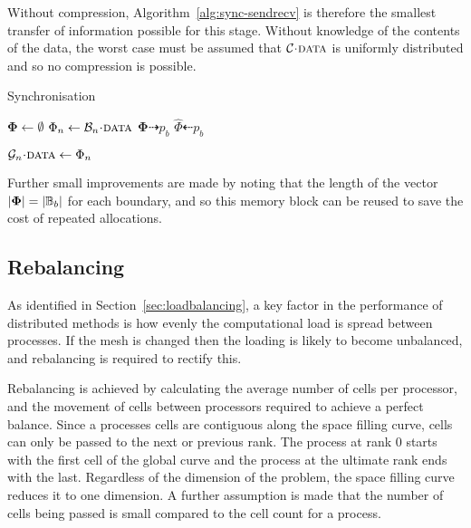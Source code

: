 \documentclass[twoside]{IIBproject}
\newcommand{\vect} [1] {\bm{#1}}
\newcommand{\dra}{\dashrightarrow}
\newcommand{\dla}{\dashleftarrow}
\newcommand{\acc}{{\mkern 0.5mu\cdot\mkern 0.5mu}}
\numberwithin{figure}{section}
\begin{document}
        Without compression, Algorithm~\ref{alg:sync-sendrecv} is therefore the smallest transfer of information possible for this stage. Without knowledge of the contents of the data, the worst case must be assumed that $\mathcal{C}\acc\textproc{data}$ is uniformly distributed and so no compression is possible. 

        \begin{algorithm}[H]
            \caption{Synchronisation}
            \label{alg:sync-sendrecv}

            \begin{algorithmic}
                    \State $\vect{\Phi} \gets \emptyset$
                        \State $\Phi_n \gets \mathcal{B}_n\acc\textproc{data}$
                    \EndFor
                    \Send $\vect{\Phi} \dra p_b$
                \EndFor
                \Statex
                    \Recv $\hat \Phi \dla p_b$

                        \State $\mathcal{G}_n\acc\textproc{data} \gets \Phi_n$
                    \EndFor
                \EndFor
            \end{algorithmic}
        \end{algorithm}

        Further small improvements are made by noting that the length of the vector $\abs{\vect{\Phi}} = \abs{\mathbb{B}_b}$ for each boundary, and so this memory block can be reused to save the cost of repeated allocations.



    \subsection{Rebalancing} %
        \label{sec:rebalancing}

        As identified in Section~\ref{sec:loadbalancing}, a key factor in the performance of distributed methods is how evenly the computational load is spread between processes. If the mesh is changed then the loading is likely to become unbalanced, and rebalancing is required to rectify this. 

        Rebalancing is achieved by calculating the average number of cells per processor, and the movement of cells between processors required to achieve a perfect balance. Since a processes cells are contiguous along the space filling curve, cells can only be passed to the next or previous rank. The process at rank 0 starts with the first cell of the global curve and the process at the ultimate rank ends with the last. Regardless of the dimension of the problem, the space filling curve reduces it to one dimension. A further assumption is made that the number of cells being passed is small compared to the cell count for a process.
\end{document}
